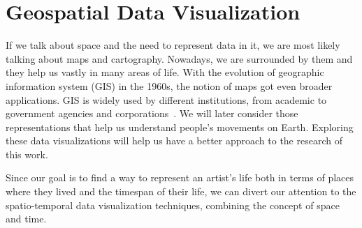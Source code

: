 \section{Geospatial Data Visualization}\label{sec:geospatial-data-visualization}

If we talk about space and the need to represent data in it, we are most likely talking about maps and cartography.
Nowadays, we are surrounded by them and they help us vastly in many areas of life. With the evolution of geographic
information system (GIS) in the 1960s, the notion of maps got even broader applications. GIS is widely used by
different institutions, from academic to government agencies and corporations~\citep{longley2005geographic}.
We will later consider those representations that help us understand people's movements on Earth. Exploring these data visualizations will
help us have a better approach to the research of this work.

Since our goal is to find a way to represent an artist’s life both in terms of places where they lived and the
timespan of their life, we can divert our attention to the spatio-temporal data visualization techniques, combining the concept
of space and time.

